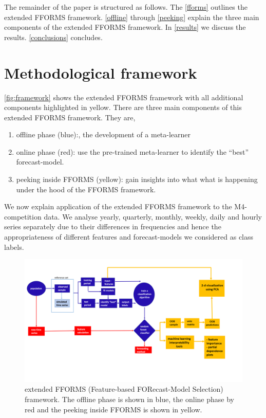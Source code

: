 \documentclass[11pt,a4paper,]{article}
\providecommand{\tightlist}{%
  \setlength{\itemsep}{0pt}\setlength{\parskip}{0pt}}
\begin{document}
The remainder of the paper is structured as follows. The
\autoref{fforms} outlines the extended FFORMS framework.
\autoref{offline} through \autoref{peeking} explain the three main
components of the extended FFORMS framework. In \autoref{results} we
discuss the results. \autoref{conclusions} concludes.

\section{Methodological framework}\label{fforms}

\autoref{fig:framework} shows the extended FFORMS framework with all
additional components highlighted in yellow. There are three main
components of this extended FFORMS framework. They are,

\begin{enumerate}
\def\labelenumi{\arabic{enumi}.}
\tightlist
\item
  offline phase (blue):, the development of a meta-learner
\item
  online phase (red): use the pre-trained meta-learner to identify the
  ``best'' forecast-model.
\item
  peeking inside FFORMS (yellow): gain insights into what what is
  happening under the hood of the FFORMS framework.
\end{enumerate}

We now explain application of the extended FFORMS framework to the
M4-competition data. We analyse yearly, quarterly, monthly, weekly,
daily and hourly series separately due to their differences in
frequencies and hence the appropriateness of different features and
forecast-models we considered as class labels.

\begin{figure}[h]
\includegraphics[width=1.15\linewidth]{figures/framework} \caption{extended FFORMS (Feature-based FORecast-Model Selection) framework. The offline phase is shown in blue, the online phase by red and the peeking inside FFORMS is shown in yellow.}\label{fig:framework}
\end{figure}
\end{document}
